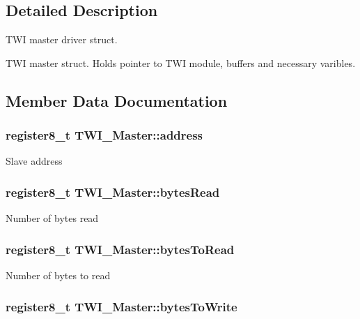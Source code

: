 \subsection{Detailed Description}
T\-W\-I master driver struct. 

T\-W\-I master struct. Holds pointer to T\-W\-I module, buffers and necessary varibles. 

\subsection{Member Data Documentation}
\hypertarget{struct_t_w_i___master_a927a9325a0f1fed17f3f3d3b2d192f72}{
\subsubsection[{address}]{\setlength{\rightskip}{0pt plus 5cm}register8\-\_\-t T\-W\-I\-\_\-\-Master\-::address}}\label{struct_t_w_i___master_a927a9325a0f1fed17f3f3d3b2d192f72}
Slave address \hypertarget{struct_t_w_i___master_aaac863ad508d7eeb9bebd2cf0b42b0ac}{
\subsubsection[{bytes\-Read}]{\setlength{\rightskip}{0pt plus 5cm}register8\-\_\-t T\-W\-I\-\_\-\-Master\-::bytes\-Read}}\label{struct_t_w_i___master_aaac863ad508d7eeb9bebd2cf0b42b0ac}
Number of bytes read \hypertarget{struct_t_w_i___master_a0af10445062189fc458400b2e8effc91}{
\subsubsection[{bytes\-To\-Read}]{\setlength{\rightskip}{0pt plus 5cm}register8\-\_\-t T\-W\-I\-\_\-\-Master\-::bytes\-To\-Read}}\label{struct_t_w_i___master_a0af10445062189fc458400b2e8effc91}
Number of bytes to read \hypertarget{struct_t_w_i___master_a5860f84e0d602e92e216c769d611a9ce}{
\subsubsection[{bytes\-To\-Write}]{\setlength{\rightskip}{0pt plus 5cm}register8\-\_\-t T\-W\-I\-\_\-\-Master\-::bytes\-To\-Write}}\label{struct_t_w_i___master_a5860f84e0d602e92e216c769d611a9ce}
